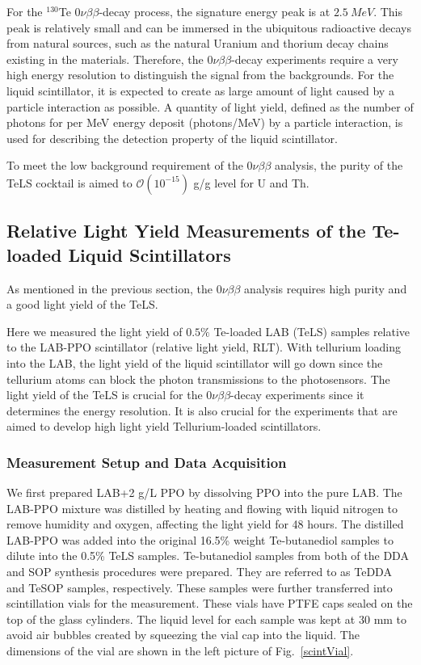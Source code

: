 For the $^{130}${Te} $0\nu\beta\beta$-decay process, the signature energy peak is at $2.5~MeV$\cite{whitepaper}. This peak is relatively small and can be immersed in the ubiquitous radioactive decays from natural sources, such as the natural Uranium and thorium decay chains existing in the materials\cite{whitepaper}. Therefore, the $0\nu\beta\beta$-decay experiments require a very high energy resolution to distinguish the signal from the backgrounds. For the liquid scintillator, it is expected to create as large amount of light caused by a particle interaction as possible. A quantity of light yield, defined as the number of photons for per MeV energy deposit (photons/MeV) by a particle interaction, is used for describing the detection property of the liquid scintillator.

To meet the low background requirement of the $0\nu\beta\beta$ analysis, the purity of the TeLS cocktail is aimed to $\mathcal{O}(10^{-15})$ g/g level for U and Th. 

\subsection{Relative Light Yield Measurements of the Te-loaded Liquid Scintillators}
As mentioned in the previous section, the $0\nu\beta\beta$ analysis requires high purity and a good light yield of the TeLS. %

Here we measured the light yield of $0.5\%$ Te-loaded LAB (TeLS) samples relative to the LAB-PPO scintillator (relative light yield, RLT). With tellurium loading into the LAB, the light yield of the liquid scintillator will go down since the tellurium atoms can block the photon transmissions to the photosensors.  The light yield of the TeLS is crucial for the $0\nu\beta\beta$-decay experiments since it determines the energy resolution. It is also crucial for the experiments that are aimed to develop high light yield Tellurium-loaded scintillators\cite{biller2017new}.

\subsubsection{Measurement Setup and Data Acquisition}

We first prepared LAB+2 g/L PPO by dissolving PPO into the pure LAB. The LAB-PPO mixture was distilled by heating and flowing with liquid nitrogen to remove humidity and oxygen, affecting the light yield for 48 hours. The distilled LAB-PPO was added into the original 16.5\% weight Te-butanediol samples to dilute into the 0.5\% TeLS samples. Te-butanediol samples from both of the DDA and SOP synthesis procedures were prepared. They are referred to as TeDDA and TeSOP samples, respectively. These samples were further transferred into scintillation vials for the measurement. These vials have PTFE caps sealed on the top of the glass cylinders. The liquid level for each sample was kept at 30 mm to avoid air bubbles created by squeezing the vial cap into the liquid. The dimensions of the vial are shown in the left picture of Fig.~\ref{scintVial}.

